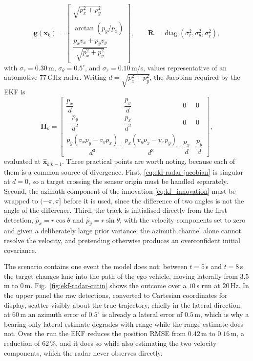 \begin{example}
\begin{equation}
\mathbf{g}(\mathbf{x}_k)=
\begin{bmatrix}
\sqrt{p_x^{2}+p_y^{2}}\\[4pt]
\arctan\!\left(p_y/p_x\right)\\[4pt]
\dfrac{p_xv_x+p_yv_y}{\sqrt{p_x^{2}+p_y^{2}}}
\end{bmatrix},
\qquad
\mathbf{R}=\operatorname{diag}\!\left(\sigma_r^{2},\sigma_\theta^{2},\sigma_{\dot r}^{2}\right),
\label{eq:ekf-radar-meas}
\end{equation}
with $\sigma_r=0.30$\,m, $\sigma_\theta=0.5^{\circ}$, and
$\sigma_{\dot r}=0.10$\,m/s, values representative of an automotive
$77$\,GHz radar. Writing $d=\sqrt{p_x^{2}+p_y^{2}}$, the Jacobian required by
the EKF is
\begin{equation}
\mathbf{H}_k=
\begin{bmatrix}
\dfrac{p_x}{d} & \dfrac{p_y}{d} & 0 & 0\\[8pt]
-\dfrac{p_y}{d^{2}} & \dfrac{p_x}{d^{2}} & 0 & 0\\[8pt]
\dfrac{p_y(v_xp_y-v_yp_x)}{d^{3}} &
\dfrac{p_x(v_yp_x-v_xp_y)}{d^{3}} &
\dfrac{p_x}{d} & \dfrac{p_y}{d}
\end{bmatrix},
\label{eq:ekf-radar-jacobian}
\end{equation}
evaluated at $\widehat{\mathbf{x}}_{k|k-1}$. Three practical points are worth
noting, because each of them is a common source of divergence. First,
\eqref{eq:ekf-radar-jacobian} is singular at $d=0$, so a target crossing the
sensor origin must be handled separately. Second, the azimuth component of the
innovation \eqref{eq:kf_innovation} must be wrapped to $(-\pi,\pi]$ before it is
used, since the difference of two angles is not the angle of the difference.
Third, the track is initialised directly from the first detection,
$\widehat{p}_x=r\cos\theta$ and $\widehat{p}_y=r\sin\theta$, with the velocity
components set to zero and given a deliberately large prior variance; the
azimuth channel alone cannot resolve the velocity, and pretending otherwise
produces an overconfident initial covariance.

The scenario contains one event the model does not: between $t=5$\,s and
$t=8$\,s the target changes lane into the path of the ego vehicle, moving
laterally from $3.5$\,m to $0$\,m. Fig.~\ref{fig:ekf-radar-cutin} shows the
outcome over a $10$\,s run at $20$\,Hz. In the upper panel the raw detections,
converted to Cartesian coordinates for display, scatter visibly about the true
trajectory, chiefly in the lateral direction: at $60$\,m an azimuth error of
$0.5^{\circ}$ is already a lateral error of $0.5$\,m, which is why a bearing-only
lateral estimate degrades with range while the range estimate does not. Over the
run the EKF reduces the position RMSE from $0.42$\,m to $0.16$\,m, a reduction of
$62$\,\%, and it does so while also estimating the two velocity components, which
the radar never observes directly.


\end{example}
